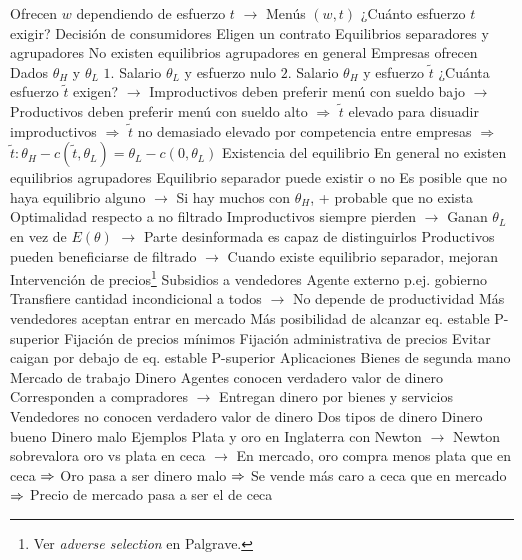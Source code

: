 \documentclass{nuevotema}
\begin{document}
\begin{esquemal}
				\4[] Ofrecen $w$ dependiendo de esfuerzo $t$
				\4[] $\to$ Menús $(w, t)$
				\4[] ¿Cuánto esfuerzo $t$ exigir?
				\4 Decisión de consumidores
				\4[] Eligen un contrato
			\3 Equilibrios separadores y agrupadores
				\4 No existen equilibrios agrupadores en general
				\4 Empresas ofrecen
				\4[] Dados $\theta_H$ y $\theta_L$
				\4[] $1.$ Salario $\theta_L$ y esfuerzo nulo
				\4[] $2.$ Salario $\theta_H$ y esfuerzo $\tilde{t}$
				\4[] ¿Cuánta esfuerzo $\tilde{t}$ exigen?
				\4[] $\to$ Improductivos deben preferir menú con sueldo bajo
				\4[] $\to$ Productivos deben preferir menú con sueldo alto
				\4[] $\Rightarrow$ $\tilde{t}$ elevado para disuadir improductivos
				\4[] $\Rightarrow$ $\tilde{t}$ no demasiado elevado por competencia entre empresas
				\4[] $\Rightarrow$ $\tilde{t}: \theta_H - c(\tilde{t}, \theta_L) = \theta_L - c(0,\theta_L)$
				\4 Existencia del equilibrio
				\4[] En general no existen equilibrios agrupadores
				\4[] Equilibrio separador puede existir o no
				\4[] Es posible que no haya equilibrio alguno
				\4[] $\to$ Si hay muchos con $\theta_H$, + probable que no exista
				\4 Optimalidad respecto a no filtrado
				\4[] Improductivos siempre pierden
				\4[] $\to$ Ganan $\theta_L$ en vez de $E(\theta)$
				\4[] $\to$ Parte desinformada es capaz de distinguirlos
				\4[] Productivos pueden beneficiarse de filtrado
				\4[] $\to$ Cuando existe equilibrio separador, mejoran
		\2 Intervención de precios\footnote{Ver \textit{adverse selection} en Palgrave.}
			\3 Subsidios a vendedores
				\4 Agente externo p.ej. gobierno
				\4[] Transfiere cantidad incondicional a todos
				\4[] $\to$ No depende de productividad
				\4 Más vendedores aceptan entrar en mercado
				\4 Más posibilidad de alcanzar eq. estable P-superior
			\3 Fijación de precios mínimos
				\4 Fijación administrativa de precios
				\4 Evitar caigan por debajo de eq. estable P-superior
		\2 Aplicaciones
			\3 Bienes de segunda mano
			\3 Mercado de trabajo
			\3 Dinero
				\4 Agentes conocen verdadero valor de dinero
				\4[] Corresponden a compradores
				\4[] $\to$ Entregan dinero por bienes y servicios
				\4 Vendedores no conocen verdadero valor de dinero
				\4 Dos tipos de dinero
				\4[] Dinero bueno
				\4[] Dinero malo
				\4 Ejemplos
				\4[] Plata y oro en Inglaterra con Newton
				\4[] $\to$ Newton sobrevalora oro vs plata en ceca
				\4[] $\to$ En mercado, oro compra menos plata que en ceca
				\4[] $\Rightarrow$ Oro pasa a ser dinero malo
				\4[] $\Rightarrow$ Se vende más caro a ceca que en mercado
				\4[] $\Rightarrow$ Precio de mercado pasa a ser el de ceca

\end{esquemal}
\end{document}
